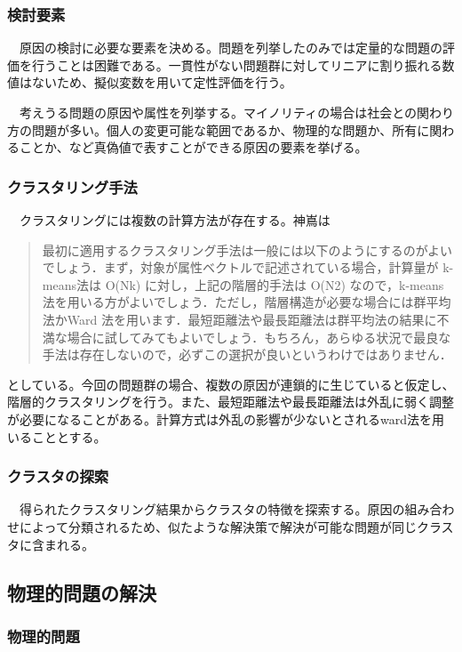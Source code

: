 \documentclass{jsarticle}
\begin{document}
\subsubsection{検討要素}
　原因の検討に必要な要素を決める。問題を列挙したのみでは定量的な問題の評価を行うことは困難である。一貫性がない問題群に対してリニアに割り振れる数値はないため、擬似変数を用いて定性評価を行う。

　考えうる問題の原因や属性を列挙する。マイノリティの場合は社会との関わり方の問題が多い。個人の変更可能な範囲であるか、物理的な問題か、所有に関わることか、など真偽値で表すことができる原因の要素を挙げる。

\subsubsection{クラスタリング手法}
　クラスタリングには複数の計算方法が存在する。神嶌は

\begin{quotation}
最初に適用するクラスタリング手法は一般には以下のようにするのがよいでしょう．まず，対象が属性ベクトルで記述されている場合，計算量が k-means法は O(Nk) に対し，上記の階層的手法は O(N2) なので，k-means法を用いる方がよいでしょう．ただし，階層構造が必要な場合には群平均法かWard 法を用います．最短距離法や最長距離法は群平均法の結果に不満な場合に試してみてもよいでしょう．もちろん，あらゆる状況で最良な手法は存在しないので，必ずこの選択が良いというわけではありません．
\end{quotation}

としている。今回の問題群の場合、複数の原因が連鎖的に生じていると仮定し、階層的クラスタリングを行う。また、最短距離法や最長距離法は外乱に弱く調整が必要になることがある。計算方式は外乱の影響が少ないとされるward法を用いることとする。


\subsubsection{クラスタの探索}
　得られたクラスタリング結果からクラスタの特徴を探索する。原因の組み合わせによって分類されるため、似たような解決策で解決が可能な問題が同じクラスタに含まれる。

\newpage
\subsection{物理的問題の解決}
\subsubsection{物理的問題}
\end{document}
